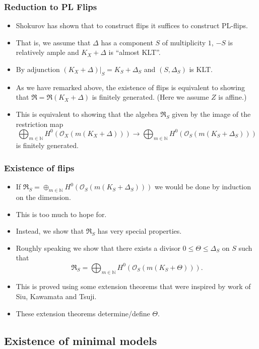 \documentclass{beamer}
\theoremstyle{plain}
\theoremstyle{definition}
\theoremstyle{remark}
\def\OO{\mathcal {O}}
\begin{document}
\begin{frame}
\frametitle{Reduction to PL Flips}
\begin{itemize}
\item Shokurov has shown that to construct flips it suffices to construct PL-flips.
\item That is, we assume that $\Delta$ has a component $S$ of multiplicity $1$, $-S$ is relatively ample and $K_X+\Delta$ is ``almost KLT''.
\item By adjunction $(K_X+\Delta )|_S=K_S+\Delta _S$ and $(S,\Delta _S)$ is KLT. 
\item As we have remarked above, the existence of flips is equivalent to showing that $\mathfrak {R}=\mathfrak {R}(K_X+\Delta )$
is finitely generated. (Here we assume $Z$ is affine.)
\item This is equivalent to showing that the algebra
$\mathfrak {R}_S$ given by the image of the restriction map
$$\bigoplus _{m\in \mathbb{N}}H^0(\OO _X(m(K_X+\Delta )))\to 
\bigoplus _{m\in \mathbb{N}}H^0(\OO _S(m(K_S+\Delta _S)))$$
is finitely generated.
\end{itemize}
\end{frame}


\begin{frame}
 \frametitle{Existence of flips}
\begin{itemize}
\item If $\mathfrak {R}_S=\oplus _{m\in \mathbb{N}}H^0(\OO _S(m(K_S+\Delta _S)))$ we would be done by induction on the dimension.
\item This is too much to hope for.
\item Instead, we show that $\mathfrak {R}_S$ has very special properties.
\item Roughly speaking we show that there exists a divisor $0\leq \Theta \leq \Delta _S$ on $S$ such that
$$\mathfrak {R}_S=\bigoplus _{m\in \mathbb{N}}H^0(\OO _S(m(K_S+\Theta))).$$
\item This is proved using some extension theorems that were inspired by work of Siu, Kawamata and Tsuji.
\item These extension theorems determine/define $\Theta$.
\end{itemize}
\end{frame}
\subsection{Existence of minimal models}
\end{document}
